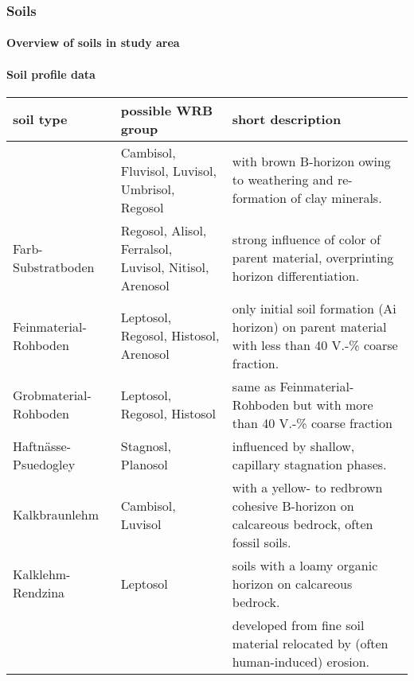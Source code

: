\documentclass[preprint,12pt,authoryear]{elsarticle}
\begin{document}
\subsubsection{Soils}
\paragraph{Overview of soils in study area}
\paragraph{Soil profile data}
\begin{table}[ht]
\centering
\small
\begin{tabular}{p{2.5cm}p{3.5cm}p{7.0cm}}
  \hline
soil type  & possible WRB group & short description \\ 
  \hline
 \raisebox{-1.5ex}{Braunerde} & {Cambisol, Fluvisol, Luvisol, Umbrisol, Regosol} & with brown B-horizon owing to  weathering and re-formation of clay minerals. \\ 
 
{Farb-Substratboden} & {Regosol, Alisol, Ferralsol, Luvisol, Nitisol, Arenosol} & {strong influence of color of parent material, overprinting horizon differentiation.} \\ 

Feinmaterial-Rohboden & {Leptosol, Regosol, Histosol, Arenosol} &{only initial soil formation (Ai horizon) on parent material with less than 40 V.-\% coarse fraction.} \\ 

Grobmaterial-Rohboden & {Leptosol, Regosol, Histosol} & {same as Feinmaterial-Rohboden but with more than 40 V.-\% coarse fraction} \\ 

Haftnässe-Psuedogley & {Stagnosl, Planosol} & {influenced by shallow, capillary stagnation phases.} \\ 

Kalkbraunlehm & {Cambisol, Luvisol} & {with a yellow- to redbrown cohesive B-horizon on calcareous bedrock, often fossil soils.} \\ 

Kalklehm-Rendzina & {Leptosol} & {soils with a loamy organic horizon on calcareous bedrock.} \\ 

\raisebox{-1.5ex}{Kolluvisol} & \raisebox{-1.5ex}{Anthrosol} & {developed from fine soil material relocated by (often human-induced) erosion.} \\ 


\end{tabular}
\end{table}
\end{document}
